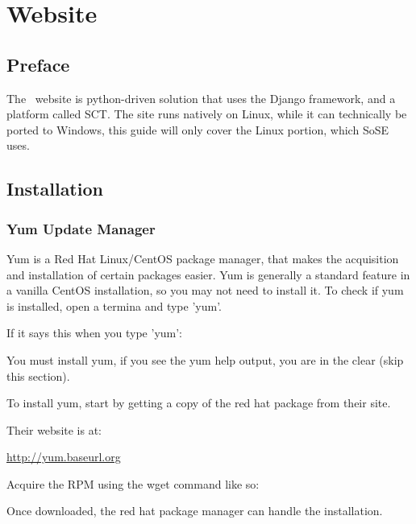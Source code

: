 \chapter{Website}
\section{Preface}
The \VTank\ website is python-driven solution that uses the Django framework, and a platform called SCT.  The site runs natively on Linux, while it can technically be ported to Windows, this guide will only cover the Linux portion, which SoSE uses.

\section{Installation}

\subsection{Yum Update Manager}
Yum is a Red Hat Linux/CentOS package manager, that makes the acquisition and installation of certain packages easier.  Yum is generally a standard feature in a vanilla CentOS installation, so you may not need to install it.  To check if yum is installed, open a termina and type 'yum'.  

\vspace{1pc}

If it says this when you type 'yum': 


You must install yum, if you see the yum help output, you are in the clear (skip this section).

\vspace{1pc}

To install yum, start by getting a copy of the red hat package from their site.  

Their website is at:

\url{http://yum.baseurl.org}

\vspace{1pc}

Acquire the RPM using the wget command like so:


\vspace{1pc}

Once downloaded, the red hat package manager can handle the installation.

